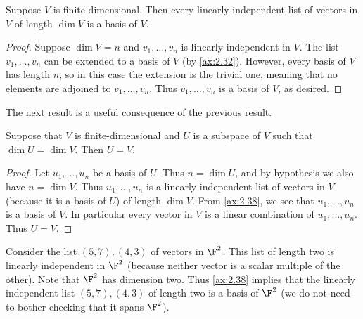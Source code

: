 \begin{result}%
\label{ax:2.38}
Suppose $V$ is finite-dimensional. Then every linearly independent list of
vectors in $V$ of length $\dim V$ is a basis of $V$.
\end{result}

\begin{proof}
Suppose $\dim V=n$ and $v_1,\dots,v_n$ is linearly independent in $V$. The list
$v_1,\dots,v_n$ can be extended to a basis of $V$ (by \ref{ax:2.32}). However,
every basis of $V$ has length $n$, so in this case the extension is the trivial
one, meaning that no elements are adjoined to $v_1,\dots,v_n$. Thus
$v_1,\dots,v_n$ is a basis of $V$, as desired.
\end{proof}

The next result is a useful consequence of the previous result.

\begin{result}\label{ax:2.39}
Suppose that $V$ is finite-dimensional and $U$ is a subspace of $V$ such that
$\dim U=\dim V$. Then $U=V$.
\end{result}

\begin{proof}
Let $u_1,\dots,u_n$ be a basis of $U$. Thus $n=\dim U$, and by hypothesis we
also have $n=\dim V$. Thus $u_1,\dots,u_n$ is a linearly independent list of
vectors in $V$ (because it is a basis of $U$) of length $\dim V$. From
\ref{ax:2.38}, we see that $u_1,\dots,u_n$ is a basis of $V$. In particular
every vector in $V$ is a linear combination of $u_1,\dots,u_n$. Thus $U=V$.
\end{proof}

\begin{example}[A basis of $\F^2$]\label{ax:2.40}
Consider the list $(5,7),(4,3)$ of vectors in $\F^2$. This list of length two
is linearly independent in $\F^2$ (because neither vector is a scalar multiple
of the other). Note that $\F^2$ has dimension two. Thus \ref{ax:2.38} implies
that the linearly independent list $(5,7),(4,3)$ of length two is a basis of
$\F^2$ (we do not need to bother checking that it spans $\F^2$).
\end{example}

